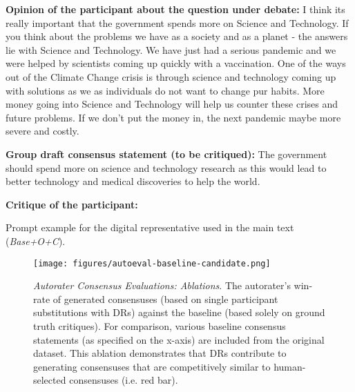 \begin{story}[ht]
{\textbf{Opinion of the participant about the question under debate:} I think its really important that the government spends more on Science and Technology. If you think about the problems we have as a society and as a planet - the answers lie with Science and Technology. We have just had a serious pandemic and we were helped by scientists coming up quickly with a vaccination. One of the ways out of the Climate Change crisis is through science and technology coming up with solutions as we as individuals do not want to change pur habits. More money going into Science and Technology will help us counter these crises and future problems. If we don't put the money in, the next pandemic maybe more severe and costly.

\textbf{Group draft consensus statement (to be critiqued):} The government should spend more on science and technology research as this would lead to better technology and medical discoveries to help the world.

\textbf{Critique of the participant:}}
 \caption[]{Prompt example for the digital representative used in the main text (\textit{Base+O+C}).}
 \label{box:prompt-example}
\end{story}

\begin{figure}[H]
\centering
\texttt{[image: figures/autoeval-baseline-candidate.png]}
\caption{\textit{Autorater Consensus Evaluations: Ablations}. The autorater's win-rate of generated consensuses (based on single participant substitutions with DRs) against the baseline (based solely on ground truth critiques). For comparison, various baseline consensus statements (as specified on the x-axis) are included from the original dataset. This ablation demonstrates that DRs contribute to generating consensuses that are competitively similar to human-selected consensuses (i.e. red bar).}
\label{fig:consensus-baselines}
\end{figure}